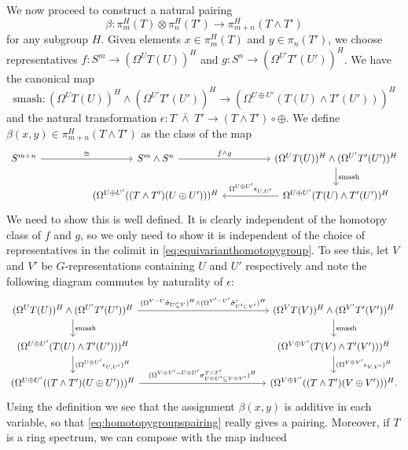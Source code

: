 We now proceed to construct a natural pairing
\begin{equation}\label{eq:homotopygroupspairing}
\beta:\pi_m^H(T)\otimes \pi_n^H(T')\to \pi^H_{m+n}(T\wedge T')
\end{equation}
for any subgroup $H$. Given elements $x\in \pi_m^H(T)$
and $y\in \pi_n(T')$, we choose representatives
$f:S^m\to (\Omega^U T(U))^H$ and $g:S^n\to (\Omega^{U'}T'(U'))^H$.
We have the canonical map
\[
\mathrm{smash}: (\Omega^U T(U))^H\wedge (\Omega^{U'} T'(U'))^H\to
(\Omega^{U\oplus U'}(T(U)\wedge T'(U')))^H
\]
and the natural transformation $\epsilon:T\;\bar\wedge\; T'\to (T\wedge T')\circ \oplus$.
We define $\beta(x,y)\in \pi_{m+n}^H(T\wedge T')$ as the class of the map
\[
\begin{tikzcd}[column sep = huge]
S^{m+n}\arrow{r}{\cong}
&S^m\wedge S^n
\arrow{r}{f\wedge g}
&(\Omega^U T(U))^H\wedge (\Omega^{U'} T'(U'))^H
\arrow{d}{\mathrm{smash}}\\
&(\Omega^{U\oplus U'} ((T\wedge T')(U\oplus U')))^H
&\Omega^{U\oplus U'}(T(U)\wedge T'(U'))^H
\arrow[swap]{l}{\Omega^{U\oplus U'}\epsilon_{U, U'}}
\end{tikzcd}
\]
We need to show this is well defined. It is clearly independent of the homotopy
class of $f$ and $g$, so we only need to show it is independent of
the choice of representatives in the colimit in \eqref{eq:equivarianthomotopygroup}.
To see this, let $V$ and $V'$ be $G$-representations containing $U$ and $U'$
respectively and note the following diagram commutes by naturality of $\epsilon$:
\[
\begin{tikzcd}[column sep=13em]
(\Omega^U T(U))^H\wedge (\Omega^{U'} T'(U'))^H
\arrow{d}{\mathrm{smash}}\arrow{r}{(\Omega^{V-U}\tilde \sigma_{U\subseteq V})^H\wedge(\Omega^{V'-U'}\tilde \sigma'_{U'\subset V'})^H}
&(\Omega^V T(V))^H\wedge (\Omega^{V'} T'(V'))^H
\arrow{d}{\mathrm{smash}}\\
(\Omega^{U\oplus U'}(T(U)\wedge T'(U')))^H
\arrow{d}{(\Omega^{U\oplus U'}\epsilon_{U,U'})^H}
&(\Omega^{V\oplus V'}(T(V)\wedge T'(V')))^H
\arrow{d}{(\Omega^{V\oplus V'}\epsilon_{V,V'})^H}\\
(\Omega^{U\oplus U'} ((T\wedge T')(U\oplus U')))^H
\arrow{r}{(\Omega^{V\oplus V'-U\oplus U'}\sigma^{T\wedge T'}_{U\oplus U'\subseteq V\oplus V'})^H}
&(\Omega^{V\oplus V'} ((T\wedge T')(V\oplus V')))^H.
\end{tikzcd}
\]
Using the definition we see that the assignment $\beta(x,y)$ is additive in each
variable, so that \eqref{eq:homotopygroupspairing} really gives a pairing.
Moreover, if $T$ is a ring spectrum, we can compose with the map induced

